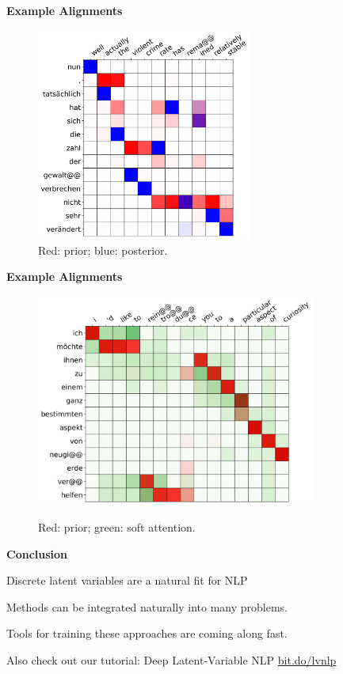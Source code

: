 \documentclass[aspectratio=169]{beamer}
\let\tempone\itemize
\let\temptwo\enditemize
\renewenvironment{itemize}{\tempone\addtolength{\itemsep}{0.5\baselineskip}}{\temptwo}
\newcommand{\thetitle}[1]{{\begin{center}\textbf{{#1}}\end{center}}}
\newcommand{\air}{\vspace{0.25cm}}
\begin{document}
\begin{frame}\thetitle{Example Alignments}
\begin{figure}[t]
  \centering
  \includegraphics[height=7cm]{img/var-attn/2531p-q-attn}
  \caption{\label{fig:attn} Red: prior; blue: posterior.}
  \label{fig:pq}
\end{figure}
\end{frame}
\begin{frame}\thetitle{Example Alignments}
\begin{figure}[t]
  \centering
  \includegraphics[height=7cm]{img/var-attn/2509svattn}
  \label{fig:pq:b}
  \caption{\label{fig:attn} Red: prior; green: soft attention.}
  \label{fig:pq}
\end{figure}
\end{frame}

\begin{frame}
  \thetitle{Conclusion}
  \begin{itemize}
  \item Discrete latent variables are a natural fit for NLP
    \air
  \item Methods can be integrated naturally into many problems.
    \air
  \item Tools for training these approaches are coming along fast.
    \air

  \item Also check out our tutorial: Deep Latent-Variable NLP
    \url{bit.do/lvnlp}

  \end{itemize}
\end{frame}
\end{document}
